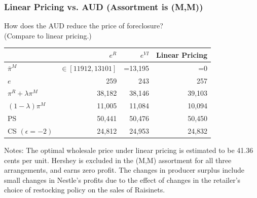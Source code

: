 \begin{frame}
\frametitle{Linear Pricing vs. AUD (Assortment is (M,M))}
How does the AUD reduce the price of foreclosure? \\ (Compare to linear pricing.)
\begin{table}[h!]
  \begin{center}
   \label{tab:linearpricing}
    \begin{tabular}{|l|rrr|} 
    \hline 
          & $e^{R}$ & $e^{VI}$ & Linear Pricing   \\ \hline
    $\overline{\pi}^M$ & $\in[11912,13101]$ & =13,195 & =0      \\
    $e$ & 259   & 243   & 257    \\
    $\pi^R + \lambda \pi^M$ & 38,182 & 38,146 & 39,103   \\
    $(1-\lambda) \pi^M$ & 11,005 & 11,084 & 10,094   \\
\hline
    PS & 50,441 & 50,476 & 50,450         \\ 
    CS $(\epsilon=-2)$& 24,812 & 24,953 & 24,832         \\ \hline 
   \end{tabular}
   \end{center}
 \tiny
Notes: The optimal wholesale price under linear pricing is estimated to be 41.36 cents per unit.  Hershey is excluded in the (M,M) assortment for all three arrangements, and earns zero profit.  The changes in producer surplus include small changes in Nestle's profits due to the effect of changes in the retailer's choice of restocking policy on the sales of Raisinets. 
\end{table}

\end{frame}


